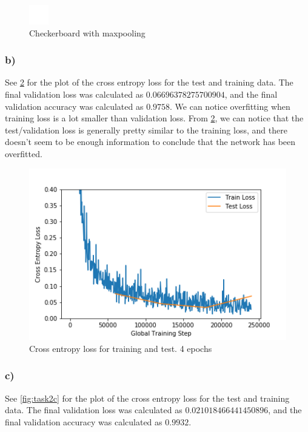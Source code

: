 \begin{figure}[]
    \centering
    \includegraphics{figures/image_processed/checkerboard_maxpooled.png}
    \caption{Checkerboard with maxpooling}
    \label{fig:checkerboard_maxpooled}
\end{figure}


\newpage
\subsubsection*{b)}
See \cref{fig:task2b} for the plot of the cross entropy loss for the test and training data. The final validation loss was calculated as $0.06696378275700904$, and the final validation accuracy was calculated as $0.9758$. We can notice overfitting when training loss is a lot smaller than validation loss. From \cref{fig:task2b}, we can notice that the test/validation loss is generally pretty similar to the training loss, and there doesn't seem to be enough information to conclude that the network has been overfitted. 

\begin{figure}[]
    \centering
    \includegraphics[width=1.00\textwidth]{figures/image_processed/task2_b.png}
    \caption{Cross entropy loss for training and test. 4 epochs}
    \label{fig:task2b}
\end{figure}


\subsubsection*{c)}
See \cref{fig:task2c} for the plot of the cross entropy loss for the test and training data. The final validation loss was calculated as $0.021018466441450896$, and the final validation accuracy was calculated as $0.9932$. 

